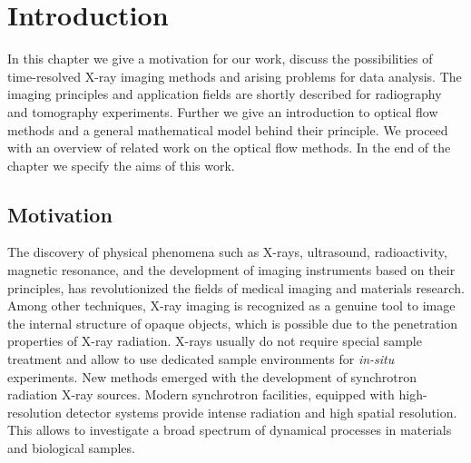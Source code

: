 \chapter {Introduction}


In this chapter we give a motivation for our work, discuss the possibilities of time-resolved X-ray imaging methods and arising problems for data analysis. The imaging principles and application fields are shortly described for radiography and tomography experiments. Further we give an introduction to optical flow methods and a general mathematical model behind their principle. We proceed with an overview of related work on the optical flow methods. In the end of the chapter we specify the aims of this work.



\section{Motivation}


The discovery of physical phenomena such as X-rays, ultrasound, radioactivity, magnetic resonance, and the development of imaging instruments based on their principles, has revolutionized the fields of medical imaging and materials research.  Among other techniques, X-ray imaging is recognized as a genuine tool to image the internal structure of opaque objects, which is possible due to the penetration properties of X-ray radiation.
X-rays usually do not require special sample treatment and allow to use dedicated sample environments for \textit{in-situ} experiments. 
New methods emerged with the development of synchrotron radiation
X-ray sources. Modern synchrotron facilities, equipped with high-resolution detector systems provide intense radiation and high spatial resolution. This allows to investigate a broad spectrum of dynamical processes  in materials and biological samples.


